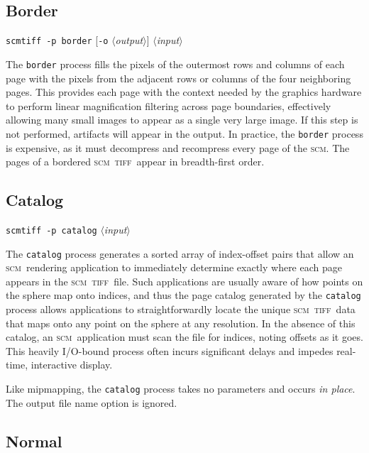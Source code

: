 \documentclass[oneside,11pt]{memoir}
\newcommand{\scm}     {\textsc{scm}}
\newcommand{\tiff}    {\textsc{tiff}}
\newcommand{\scmtiff} {\texttt{scmtiff}}
\newcommand{\inangles}[1]{$\langle$#1$\rangle$}
\begin{document}
\begin{Spacing}{1.1}
\subsection{Border}

\noindent\scmtiff\ \texttt{-p border} [\texttt{-o} \inangles{\textit{output}}] \inangles{\textit{input}}

\bigskip The \texttt{border} process fills the pixels of the outermost rows and columns of each page with the pixels from the adjacent rows or columns of the four neighboring pages. This provides each page with the context needed by the graphics hardware to perform linear magnification filtering across page boundaries, effectively allowing many small images to appear as a single very large image. If this step is not performed, artifacts will appear in the output. In practice, the \texttt{border} process is expensive, as it must decompress and recompress every page of the \scm. The pages of a bordered \scm\ \tiff\ appear in breadth-first order.

\subsection{Catalog}

\noindent\scmtiff\ \texttt{-p catalog} \inangles{\textit{input}}

\bigskip The \texttt{catalog} process generates a sorted array of index-offset pairs that allow an \scm\ rendering application to immediately determine exactly where each page appears in the \scm\ \tiff\ file. Such applications are usually aware of how points on the sphere map onto indices, and thus the page catalog generated by the \texttt{catalog} process allows applications to straightforwardly locate the unique \scm\ \tiff\ data that maps onto any point on the sphere at any resolution. In the absence of this catalog, an \scm\ application must scan the file for indices, noting offsets as it goes. This heavily I/O-bound process often incurs significant delays and impedes real-time, interactive display.

Like mipmapping, the \texttt{catalog} process takes no parameters and occurs \emph{in place}. The output file name option is ignored.

\subsection{Normal}


\end{Spacing}
\end{document}
